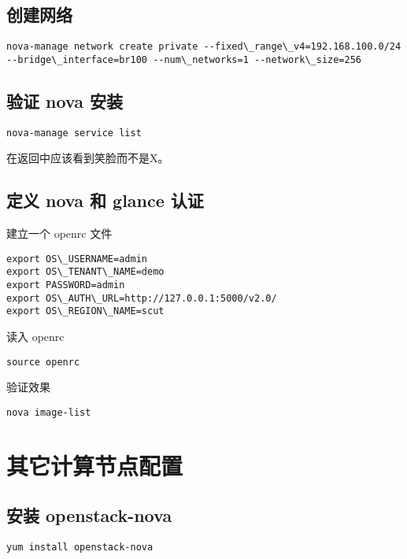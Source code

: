 \documentclass[letterpaper,10pt,english]{sphinxmanual}
\begin{document}
\section{创建网络}
\label{nova:id7}
\begin{Verbatim}[commandchars=\\\{\}]
nova-manage network create private --fixed\_range\_v4=192.168.100.0/24 --bridge\_interface=br100 --num\_networks=1 --network\_size=256
\end{Verbatim}


\section{验证 nova 安装}
\label{nova:id8}
\begin{Verbatim}[commandchars=\\\{\}]
nova-manage service list
\end{Verbatim}

在返回中应该看到笑脸而不是X。


\section{定义 nova 和 glance 认证}
\label{nova:nova-glance}
建立一个 openrc 文件

\begin{Verbatim}[commandchars=\\\{\}]
export OS\_USERNAME=admin
export OS\_TENANT\_NAME=demo
export PASSWORD=admin
export OS\_AUTH\_URL=http://127.0.0.1:5000/v2.0/
export OS\_REGION\_NAME=scut
\end{Verbatim}

读入 openrc

\begin{Verbatim}[commandchars=\\\{\}]
source openrc
\end{Verbatim}

验证效果

\begin{Verbatim}[commandchars=\\\{\}]
nova image-list
\end{Verbatim}


\chapter{其它计算节点配置}
\label{nova_compute::doc}\label{nova_compute:id1}

\section{安装 openstack-nova}
\label{nova_compute:openstack-nova}
\begin{Verbatim}[commandchars=\\\{\}]
yum install openstack-nova
\end{Verbatim}
\end{document}
